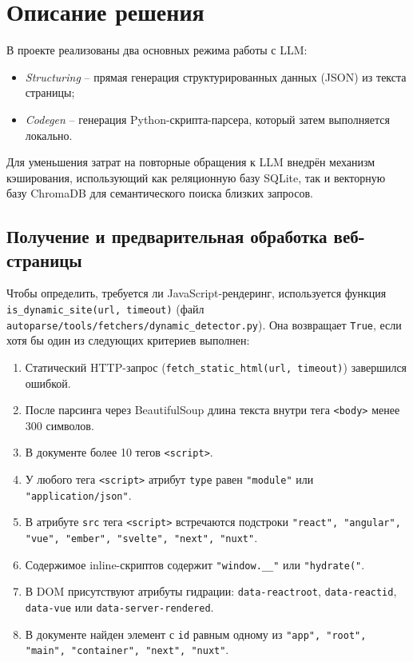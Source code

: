 
\section{Описание решения}

В проекте реализованы два основных режима работы с LLM:
\begin{itemize}
    \item \emph{Structuring} – прямая генерация структурированных данных (JSON) из текста страницы;
    \item \emph{Codegen} – генерация Python-скрипта-парсера, который затем выполняется локально.
\end{itemize}
Для уменьшения затрат на повторные обращения к LLM внедрён механизм кэширования, использующий как реляционную базу SQLite, так и векторную базу ChromaDB для семантического поиска близких запросов.

\subsection{Получение и предварительная обработка веб-страницы}
\label{subsec:solution1}

Чтобы определить, требуется ли JavaScript-рендеринг, используется функция \texttt{is\_dynamic\_site(url, timeout)} (файл \texttt{autoparse/tools/fetchers/dynamic\_detector.py}). Она возвращает \texttt{True}, если хотя бы один из следующих критериев выполнен:
\begin{enumerate}
    \item Статический HTTP-запрос (\texttt{fetch\_static\_html(url, timeout)}) завершился ошибкой.
    \item После парсинга через BeautifulSoup длина текста внутри тега \texttt{<body>} менее 300 символов.
    \item В документе более 10 тегов \texttt{<script>}.
    \item У любого тега \texttt{<script>} атрибут \texttt{type} равен \texttt{"module"} или \texttt{"application/json"}.
    \item В атрибуте \texttt{src} тега \texttt{<script>} встречаются подстроки \texttt{"react", "angular", "vue", "ember", "svelte", "next", "nuxt"}.
    \item Содержимое inline-скриптов содержит \texttt{"window.\_\_"} или \texttt{"hydrate("}.
    \item В DOM присутствуют атрибуты гидрации: \texttt{data-reactroot}, \texttt{data-reactid}, \texttt{data-vue} или \texttt{data-server-rendered}.
    \item В документе найден элемент с \texttt{id} равным одному из \texttt{"app", "root", "main", "container", "next", "nuxt"}.
\end{enumerate}

